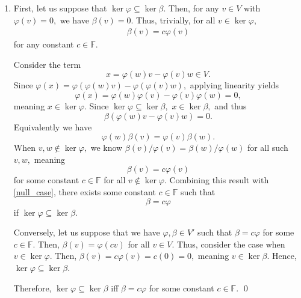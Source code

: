 \documentclass[12pt]{article}
\begin{document}
\begin{enumerate}
    For the reverse direction, assume $U \subseteq \ker T.$ Assume
    for the sake of contradiction that
    $$
    v + U = v' + u
    $$
    for some $v \neq v'.$ Then, $v - v' = U \subseteq \ker T,$
    meaning $T(v - v') = 0,$ and hence $T(v) = T(v').$

    Thus, define $S \in \mathcal L(V/U, W)$ such that
    $$
    S(v + U) = T(v),
    $$
    since it is guaranteed to be a function, yielding $T(v) = S\pi v$
    for all $v.$ Thus, if $U \subseteq \ker T,$ we have $T = S \circ
    \pi$ as required. \qed

  \item First, let us suppose that $\ker \varphi \subseteq \ker
    \beta.$ Then, for any $v \in V$ with $\varphi(v) = 0,$ we have
    $\beta(v) = 0.$ Thus, trivially, for all $v \in \ker \varphi,$
    \begin{align}
      \beta(v)  = c\varphi(v) \label{null_case}
    \end{align}
    for any constant $c \in \mathbb F.$

    Consider the term $$
    x = \varphi(w) v - \varphi(v) w \in V.
    $$
    Since $\varphi(x) = \varphi(\varphi(w)v) - \varphi(\varphi(v)w),$
    applying linearity yields
    $$
    \varphi(x) = \varphi(w) \varphi(v) - \varphi(v) \varphi(w) = 0,
    $$
    meaning $x \in \ker \varphi.$ Since $\ker \varphi \subseteq \ker
    \beta,$ $x \in \ker \beta,$ and thus
    $$
    \beta(\varphi(w)v - \varphi(v)w) = 0.
    $$
    Equivalently we have
    $$
    \varphi(w) \beta(v) = \varphi(v) \beta(w).
    $$
    When $v, w \not \in \ker \varphi,$ we know $\beta(v)/\varphi(v) =
    \beta(w)/\varphi(w)$ for all such $v, w,$ meaning
    $$
    \beta(v) = c\varphi(v)
    $$
    for some constant $c \in \mathbb F$ for all $v \not \in \ker
    \varphi.$ Combining this result with \eqref{null_case}, there
    exists some constant $c \in \mathbb F$ such that
    $$
    \beta = c \varphi
    $$
    if $\ker \varphi \subseteq \ker \beta.$

    Conversely, let us suppose that we have $\varphi, \beta \in V'$
    such that $\beta = c \varphi$ for some $c \in \mathbb F.$ Then,
    $\beta(v) = \varphi(cv)$ for all $v \in V.$ Thus, consider the
    case when $v \in \ker \varphi.$ Then, $\beta(v) = c\varphi(v) =
    c(0) = 0,$ meaning $v \in \ker \beta.$ Hence, $\ker \varphi
    \subseteq \ker \beta.$

    Therefore, $\ker \varphi \subseteq \ker \beta$ iff $\beta = c
    \varphi$ for some constant $c \in \mathbb F.$ \qed
\end{enumerate}
\end{document}
